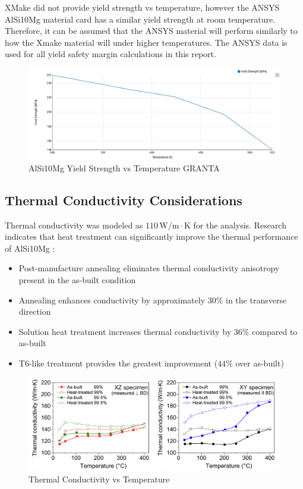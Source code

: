 XMake did not provide yield strength vs temperature, however the ANSYS AlSi10Mg material card has a similar yield strength at room temperature. Therefore, it can be assumed that the ANSYS material will perform similarly to how the Xmake material will under higher temperatures. The ANSYS data is used for all yield safety margin calculations in this report.  
\begin{figure}
    \centering
    \includegraphics[width=1\linewidth]{Images/AlSi10Mg Yield Strength vs Temperature GRANTA.png}
    \caption{AlSi10Mg Yield Strength vs Temperature GRANTA}
    \label{fig:AlSi10Mg Yield Strength vs Temperature GRANTA}
\end{figure}

\subsection{Thermal Conductivity Considerations}

Thermal conductivity was modeled as $110\,\text{W/m}\cdot\text{K}$ for the analysis. Research indicates that heat treatment can significantly improve the thermal performance of AlSi10Mg \cite{martinez2020}:

\begin{itemize}
    \item Post-manufacture annealing eliminates thermal conductivity anisotropy present in the as-built condition
    \item Annealing enhances conductivity by approximately $30\%$ in the transverse direction
    \item Solution heat treatment increases thermal conductivity by $36\%$ compared to as-built
    \item T6-like treatment provides the greatest improvement ($44\%$ over as-built) \cite{martinez2020}
\end{itemize}

\begin{figure}
    \centering
    \includegraphics[width=1\linewidth]{Images/Thermal Conductivity vs Temperature.png}
    \caption{Thermal Conductivity vs Temperature \cite{martinez2020}}
    \label{fig:Thermal Conductivity vs Temperature}
\end{figure}

